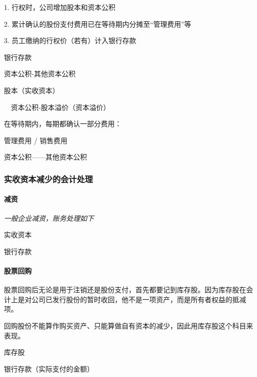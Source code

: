 \documentclass[UTF8,12pt]{ctexart}
\newenvironment{Dr}{%
	\begin{list}{}%
		{
			\setlength{\leftmargin}{2em}
			\setlength{\labelwidth}{2em}
			\setlength{\labelsep}{0pt}
			\setlength{\itemindent}{0pt}
			\setlength{\listparindent}{0pt}
			\setlength{\parsep}{0pt}
			\setlength{\topsep}{0pt}
		}
		\item[\textbf{借：}]
	}{%
	\end{list}
}
\newenvironment{Cr}{%
	\begin{list}{}%
		{
			\setlength{\leftmargin}{2em}
			\setlength{\labelwidth}{2em}
			\setlength{\labelsep}{0pt}
			\setlength{\itemindent}{0pt}
			\setlength{\listparindent}{0pt}
			\setlength{\parsep}{0pt}
			\setlength{\topsep}{0pt}
		}
		\item[\textbf{贷：}]
	}{%
	\end{list}
}
\numberwithin{equation}{section} %
\numberwithin{figure}{section}
\numberwithin{table}{section}
\begin{document}
	1. 行权时，公司增加股本和资本公积
	
	2. 累计确认的股份支付费用已在等待期内分摊至“管理费用”等
	
	3. 员工缴纳的行权价（若有）计入银行存款
	
	\begin{Dr}
		银行存款
		
		资本公积-其他资本公积
	\end{Dr}
	\begin{Cr}
		股本（实收资本）
		
		\ \ 资本公积-股本溢价（资本溢价）
	\end{Cr}
	
	在等待期内，每期都确认一部分费用：
	
	\begin{Dr}
		管理费用 / 销售费用
	\end{Dr}
	\begin{Cr}
		资本公积——其他资本公积
	\end{Cr}

	
	\subsubsection{实收资本减少的会计处理}
	
	\paragraph{减资}
	
	\textit{一般企业减资，账务处理如下}
	
	\begin{Dr}
		实收资本
	\end{Dr}
	\begin{Cr}
		银行存款
	\end{Cr}
	
	\paragraph{股票回购}
	
	股票回购后无论是用于注销还是股份支付，首先都要记到库存股。因为库存股在会计上是对公司已发行股份的暂时收回，他不是一项资产，而是所有者权益的抵减项。
	
	回购股份不能算作购买资产、只能算做自有资本的减少，因此用库存股这个科目来表现。
	
	\begin{Dr}
		库存股
	\end{Dr}
	\begin{Cr}
		银行存款（实际支付的金额）
	\end{Cr}
	
\end{document}
